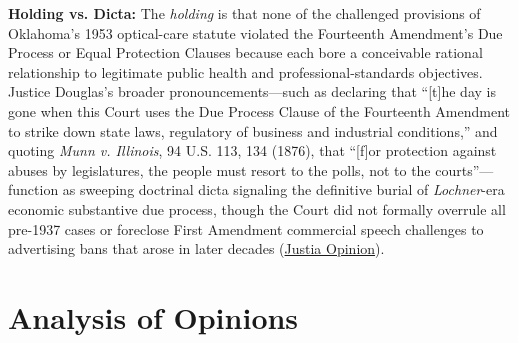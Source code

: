 \documentclass[12pt]{article}
\begin{document}
\textbf{Holding vs. Dicta:} The \textit{holding} is that none of the challenged provisions of Oklahoma's 1953 optical-care statute violated the Fourteenth Amendment's Due Process or Equal Protection Clauses because each bore a conceivable rational relationship to legitimate public health and professional-standards objectives. Justice Douglas's broader pronouncements---such as declaring that ``[t]he day is gone when this Court uses the Due Process Clause of the Fourteenth Amendment to strike down state laws, regulatory of business and industrial conditions,'' and quoting \textit{Munn v. Illinois}, 94 U.S. 113, 134 (1876), that ``[f]or protection against abuses by legislatures, the people must resort to the polls, not to the courts''---function as sweeping doctrinal dicta signaling the definitive burial of \textit{Lochner}-era economic substantive due process, though the Court did not formally overrule all pre-1937 cases or foreclose First Amendment commercial speech challenges to advertising bans that arose in later decades (\href{https://supreme.justia.com/cases/federal/us/348/483/}{Justia Opinion}).

\section{Analysis of Opinions}
\end{document}
